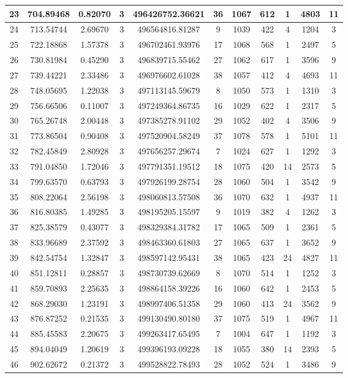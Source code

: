 \begin{longtable}{|c|c|c|c|c|c|c|c|c|c|c|}
\hline 
23&704.89468&0.82070&3&496426752.36621&36&1067&612&1&4803&11\\ 
\hline 
24&713.54744&2.69670&3&496564816.81287&9&1039&422&4&1204&3\\ 
\hline 
25&722.18868&1.57378&3&496702461.93976&17&1068&568&1&2497&5\\ 
\hline 
26&730.81984&0.45290&3&496839715.55462&27&1062&617&1&3596&9\\ 
\hline 
27&739.44221&2.33486&3&496976602.61028&38&1057&412&4&4693&11\\ 
\hline 
28&748.05695&1.22038&3&497113145.59679&8&1050&573&1&1310&3\\ 
\hline 
29&756.66506&0.11007&3&497249364.86735&16&1029&622&1&2317&5\\ 
\hline 
30&765.26748&2.00448&3&497385278.91102&29&1052&402&4&3506&9\\ 
\hline 
31&773.86504&0.90408&3&497520904.58249&37&1078&578&1&5101&11\\ 
\hline 
32&782.45849&2.80928&3&497656257.29674&7&1024&627&1&1292&3\\ 
\hline 
33&791.04850&1.72046&3&497791351.19512&18&1075&420&14&2573&5\\ 
\hline 
34&799.63570&0.63793&3&497926199.28754&28&1060&504&1&3542&9\\ 
\hline 
35&808.22064&2.56198&3&498060813.57508&36&1070&632&1&4937&11\\ 
\hline 
36&816.80385&1.49285&3&498195205.15597&9&1019&382&4&1262&3\\ 
\hline 
37&825.38579&0.43077&3&498329384.31782&17&1065&509&1&2361&5\\ 
\hline 
38&833.96689&2.37592&3&498463360.61803&27&1065&637&1&3652&9\\ 
\hline 
39&842.54754&1.32847&3&498597142.95431&38&1065&423&24&4827&11\\ 
\hline 
40&851.12811&0.28857&3&498730739.62669&8&1070&514&1&1252&3\\ 
\hline 
41&859.70893&2.25635&3&498864158.39226&16&1060&642&1&2453&5\\ 
\hline 
42&868.29030&1.23191&3&498997406.51358&29&1060&413&24&3562&9\\ 
\hline 
43&876.87252&0.21535&3&499130490.80180&37&1075&519&1&4967&11\\ 
\hline 
44&885.45583&2.20675&3&499263417.65495&7&1004&647&1&1192&3\\ 
\hline 
45&894.04049&1.20619&3&499396193.09228&18&1055&380&14&2393&5\\ 
\hline 
46&902.62672&0.21372&3&499528822.78493&28&1052&524&1&3486&9\\ 

\end{longtable}
